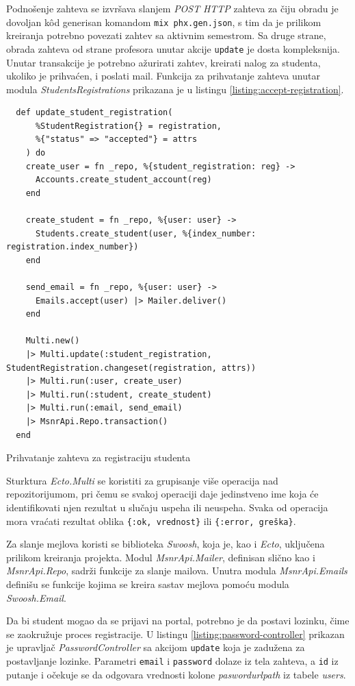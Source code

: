 \documentclass[12pt,oneside]{memoir}
\begin{document}
Podnošenje zahteva se izvršava slanjem \emph{POST} \emph{HTTP} zahteva za čiju obradu je dovoljan k\^{o}d generisan komandom
\texttt{mix phx.gen.json}, s tim da je prilikom kreiranja potrebno povezati zahtev sa aktivnim semestrom.
Sa druge strane, obrada zahteva od strane profesora unutar akcije \texttt{update} je dosta kompleksnija.
Unutar transakcije je potrebno ažurirati zahtev, kreirati nalog za studenta, ukoliko je prihvaćen, i poslati mail.
Funkcija za prihvatanje zahteva unutar modula \emph{StudentsRegistrations} prikazana je u listingu \ref{listing:accept-registration}.
\begin{listing}[h]
\begin{verbatim}
  def update_student_registration(
      %StudentRegistration{} = registration,
      %{"status" => "accepted"} = attrs
    ) do
    create_user = fn _repo, %{student_registration: reg} ->
      Accounts.create_student_account(reg)
    end

    create_student = fn _repo, %{user: user} ->
      Students.create_student(user, %{index_number: registration.index_number})
    end

    send_email = fn _repo, %{user: user} ->
      Emails.accept(user) |> Mailer.deliver()
    end

    Multi.new()
    |> Multi.update(:student_registration, StudentRegistration.changeset(registration, attrs))
    |> Multi.run(:user, create_user)
    |> Multi.run(:student, create_student)
    |> Multi.run(:email, send_email)
    |> MsnrApi.Repo.transaction()
  end
\end{verbatim}
\caption{Prihvatanje zahteva za registraciju studenta}
\label{listing:accept-registration}
\end{listing}
Sturktura \emph{Ecto.Multi} se koristiti za grupisanje više operacija nad repozitorijumom, pri čemu se svakoj
operaciji daje jedinstveno ime koja će identifikovati njen rezultat u slučaju uspeha ili neuspeha. Svaka od 
operacija mora vraćati rezultat oblika \texttt{\{:ok, vrednost\}} ili \texttt{\{:error, greška\}}.

Za slanje mejlova koristi se biblioteka \emph{Swoosh}, koja je, kao i \emph{Ecto}, uključena prilikom kreiranja
projekta. Modul \emph{MsnrApi.Mailer}, definisan slično kao i \emph{MsnrApi.Repo}, sadrži funkcije za slanje mailova.
Unutra modula \emph{MsnrApi.Emails} definišu se funkcije kojima se kreira sastav mejlova pomoću modula \emph{Swoosh.Email}.

Da bi student mogao da se prijavi na portal, potrebno je da postavi lozinku, čime se zaokružuje proces registracije.
U listingu \ref{listing:password-controller} prikazan je upravljač \emph{PasswordController} sa akcijom \texttt{update} koja je
zadužena za postavljanje lozinke. Parametri \texttt{email} i \texttt{password} dolaze iz tela zahteva, a \texttt{id} iz putanje
i očekuje se da odgovara vrednosti kolone \emph{pasword{\textunderscore}url{\textunderscore}path} iz tabele \emph{users}.
\end{document}
